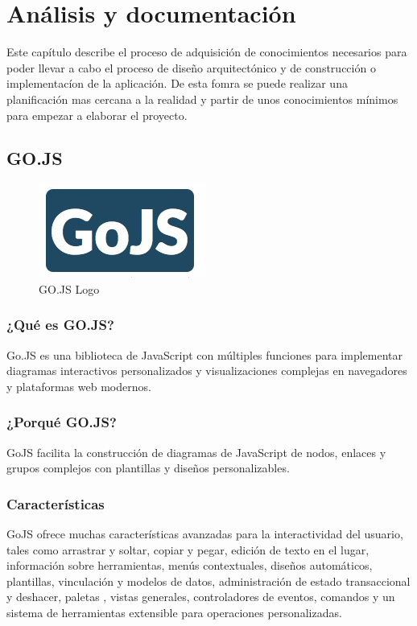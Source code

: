 \documentclass[a4paper,12pt]{book}
\begin{document}
	
	
	\clearpage
	

	 \chapter{Análisis y documentación}
	 Este capítulo describe el proceso de adquisición de conocimientos necesarios para poder llevar a cabo el proceso de diseño arquitectónico y de construcción o implementacíon de la aplicación. De esta fomra se puede realizar una planificación mas cercana a la realidad y partir de unos conocimientos mínimos para empezar a elaborar el proyecto.
	 
	 \minitoc
	 
	 	\section{GO.JS}
	 		
	 		
	 		\begin{figure}[H]
	 			\centering
	 			\includegraphics[scale=1]{gojs.jpeg}
	 			\caption{GO.JS Logo}\label{fig:gojs}
	 		\end{figure}
	 	
	 	
	 		\subsection{¿Qué es GO.JS?}
	 			Go.JS \cite{gojs} es una biblioteca de JavaScript con múltiples funciones para implementar diagramas interactivos personalizados y visualizaciones complejas en navegadores y plataformas web modernos.
	 	
	 		\subsection{¿Porqué GO.JS?}
	 		 GoJS facilita la construcción de diagramas de JavaScript de nodos, enlaces y grupos complejos con plantillas y diseños personalizables.
	 		
	 		
	 		\subsection{Características}
	 		GoJS ofrece muchas características avanzadas para la interactividad del usuario, tales como arrastrar y soltar, copiar y pegar, edición de texto en el lugar, información sobre herramientas, menús contextuales, diseños automáticos, plantillas, vinculación y modelos de datos, administración de estado transaccional y deshacer, paletas , vistas generales, controladores de eventos, comandos y un sistema de herramientas extensible para operaciones personalizadas.
	 		
\end{document}
